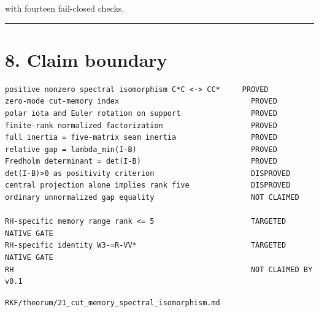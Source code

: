 with fourteen fail-closed checks.

\begin{center}\rule{0.5\linewidth}{0.5pt}\end{center}

\hypertarget{claim-boundary}{%
\section{8. Claim boundary}\label{claim-boundary}}

\begin{verbatim}
positive nonzero spectral isomorphism C*C <-> CC*     PROVED
zero-mode cut-memory index                              PROVED
polar iota and Euler rotation on support                PROVED
finite-rank normalized factorization                    PROVED
full inertia = five-matrix seam inertia                 PROVED
relative gap = lambda_min(I-B)                          PROVED
Fredholm determinant = det(I-B)                         PROVED
det(I-B)>0 as positivity criterion                      DISPROVED
central projection alone implies rank five              DISPROVED
ordinary unnormalized gap equality                      NOT CLAIMED

RH-specific memory range rank <= 5                      TARGETED NATIVE GATE
RH-specific identity W3-=R-VV*                          TARGETED NATIVE GATE
RH                                                      NOT CLAIMED BY v0.1
\end{verbatim}

\begin{flushright}\small\texttt{RKF/theorum/21\_cut\_memory\_spectral\_isomorphism.md}\end{flushright}
